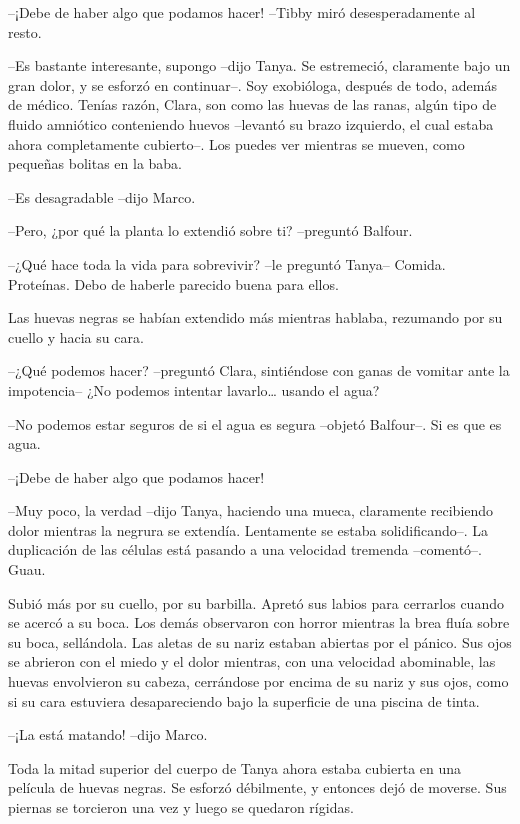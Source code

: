 {--¡Debe de haber algo que podamos hacer! --Tibby miró desesperadamente
al resto.}

{--Es bastante interesante, supongo --dijo Tanya. Se estremeció,
 claramente bajo un gran dolor, y se esforzó en continuar--. Soy
 exobióloga, después de todo, además de médico. Tenías razón, Clara, son
 como las huevas de las ranas, algún tipo de fluido amniótico conteniendo
 huevos --levantó su brazo izquierdo, el cual estaba ahora completamente
 cubierto--. Los puedes ver mientras se mueven, como pequeñas bolitas en
la baba.}

{--Es desagradable --dijo Marco.}

{--Pero, ¿por qué la planta lo extendió sobre ti? --preguntó Balfour.}

{--¿Qué hace toda la vida para sobrevivir? --le preguntó Tanya-- Comida.
Proteínas. Debo de haberle parecido buena para ellos.}

{Las huevas negras se habían extendido más mientras hablaba, rezumando
por su cuello y hacia su cara.}

{--¿Qué podemos hacer? --preguntó Clara, sintiéndose con ganas de vomitar
 ante la impotencia-- ¿No podemos intentar lavarlo\ldots{} usando el
agua?}

{--No podemos estar seguros de si el agua es segura --objetó Balfour--.
Si es que es agua.}

{--¡Debe de haber algo que podamos hacer!}

{--Muy poco, la verdad --dijo Tanya, haciendo una mueca, claramente
 recibiendo dolor mientras la negrura se extendía. Lentamente se estaba
 solidificando--. La duplicación de las células está pasando a una
velocidad tremenda --comentó--. Guau.}

{Subió más por su cuello, por su barbilla. Apretó sus labios para
 cerrarlos cuando se acercó a su boca. Los demás observaron con horror
 mientras la brea fluía sobre su boca, sellándola. Las aletas de su nariz
 estaban abiertas por el pánico. Sus ojos se abrieron con el miedo y el
 dolor mientras, con una velocidad abominable, las huevas envolvieron su
 cabeza, cerrándose por encima de su nariz y sus ojos, como si su cara
estuviera desapareciendo bajo la superficie de una piscina de tinta.}

{--¡La está matando! --dijo Marco.}

{Toda la mitad superior del cuerpo de Tanya ahora estaba cubierta en una
 película de huevas negras. Se esforzó débilmente, y entonces dejó de
moverse. Sus piernas se torcieron una vez y luego se quedaron rígidas.}

